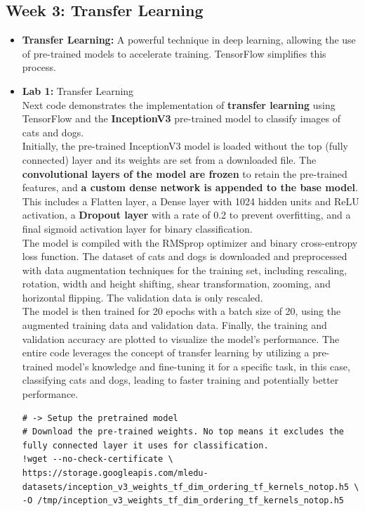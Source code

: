 \documentclass[20pt]{article}
\begin{document}
	\subsection{Week 3: Transfer Learning}
	\begin{itemize}
		\item \textbf{Transfer Learning:} A powerful technique in deep learning, allowing the use of pre-trained models to accelerate training. TensorFlow simplifies this process.
		\item \textbf{Lab 1:} Transfer Learning\\
		Next code demonstrates the implementation of \textbf{transfer learning} using TensorFlow and the \textbf{InceptionV3} pre-trained model to classify images of cats and dogs.\\ Initially, the pre-trained InceptionV3 model is loaded without the top (fully connected) layer and its weights are set from a downloaded file. The \textbf{convolutional layers of the model are frozen} to retain the pre-trained features, and \textbf{a custom dense network is appended to the base model}. This includes a Flatten layer, a Dense layer with 1024 hidden units and ReLU activation, a \textbf{Dropout layer} with a rate of 0.2 to prevent overfitting, and a final sigmoid activation layer for binary classification.\\
		The model is compiled with the RMSprop optimizer and binary cross-entropy loss function. The dataset of cats and dogs is downloaded and preprocessed with data augmentation techniques for the training set, including rescaling, rotation, width and height shifting, shear transformation, zooming, and horizontal flipping. The validation data is only rescaled.\\
		The model is then trained for 20 epochs with a batch size of 20, using the augmented training data and validation data. Finally, the training and validation accuracy are plotted to visualize the model's performance. The entire code leverages the concept of transfer learning by utilizing a pre-trained model's knowledge and fine-tuning it for a specific task, in this case, classifying cats and dogs, leading to faster training and potentially better performance.
		\begin{verbatim}
# -> Setup the pretrained model
# Download the pre-trained weights. No top means it excludes the fully connected layer it uses for classification.
!wget --no-check-certificate \
https://storage.googleapis.com/mledu-datasets/inception_v3_weights_tf_dim_ordering_tf_kernels_notop.h5 \
-O /tmp/inception_v3_weights_tf_dim_ordering_tf_kernels_notop.h5


\end{verbatim}
\end{itemize}
\end{document}
